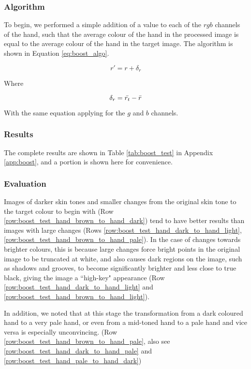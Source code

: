\subsubsection*{Algorithm}
To begin, we performed a simple addition of a value to each of the $rgb$ channels of the hand, such that the average colour of the hand in the processed image is equal to the average colour of the hand in the target image. The algorithm is shown in Equation \ref{eq:boost_algo}.

\begin{equation} \label{eq:boost_algo}
r' = r + \delta_r
\end{equation}

Where 

\begin{equation*}
\delta_r = \bar{r_t} - \bar{r}
\end{equation*}


With the same equation applying for the $g$ and $b$ channels.

\subsubsection*{Results}
The complete results are shown in Table \ref{tab:boost_test} in Appendix \ref{app:boost}, and a portion is shown here for convenience.


\subsubsection*{Evaluation}
Images of darker skin tones and smaller changes from the original skin tone to the target colour to begin with (Row \ref{row:boost_test_hand_brown_to_hand_dark}) tend to have better results than images with large changes (Rows \ref{row:boost_test_hand_dark_to_hand_light}, \ref{row:boost_test_hand_brown_to_hand_pale}). In the case of changes towards brighter colours, this is because large changes force bright points in the original image to be truncated at white, and also causes dark regions on the image, such as shadows and grooves, to become significantly brighter and less close to true black, giving the image a ``high-key" appearance (Row \ref{row:boost_test_hand_dark_to_hand_light} and \ref{row:boost_test_hand_brown_to_hand_light}).

In addition, we noted that at this stage the transformation from a dark coloured hand to a very pale hand, or even from a mid-toned hand to a pale hand and vice versa is especially unconvincing. (Row \ref{row:boost_test_hand_brown_to_hand_pale}, also see \ref{row:boost_test_hand_dark_to_hand_pale} and \ref{row:boost_test_hand_pale_to_hand_dark})
